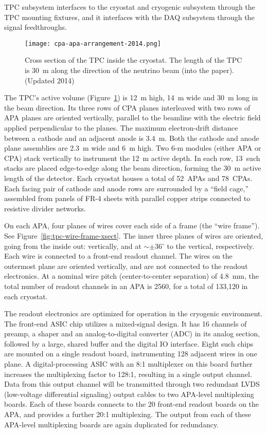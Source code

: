 TPC subsystem interfaces to the cryostat and cryogenic subsystem through the TPC mounting fixtures, 
and it interfaces with the DAQ subsystem through the signal feedthroughs.

\begin{figure}
\centering
\texttt{[image: cpa-apa-arrangement-2014.png]}%
\caption[Cross section of the TPC inside the cryostat]{Cross section of the TPC inside the cryostat.  The length of the TPC is  30~m along the direction of the neutrino beam (into the paper). (Updated 2014) }
\label{fig:tpc-xsect1}
\end{figure}

The TPC's active volume (Figure~\ref{fig:tpc-xsect1}) is 12~m high, 14~m wide and 30~m long in the beam direction. 
Its three rows of CPA planes interleaved with two rows of APA planes 
are oriented vertically, parallel to the beamline with the  
electric field applied perpendicular to the planes.
The maximum electron-drift distance between a cathode and an adjacent 
anode is 3.4~m. Both the cathode and anode plane assemblies are 
2.3~m wide and 6~m high. Two 6-m modules (either APA or CPA)  stack vertically to 
instrument the 12~m active depth. In each row, 13~such stacks are placed 
edge-to-edge 
along the beam direction, forming the 30~m active length of the detector.
Each cryostat houses a total of 52~APAs and 78~CPAs.
Each facing pair of cathode and anode rows are surrounded by a 
``field cage,'' assembled from panels of FR-4 sheets with parallel copper strips connected to resistive divider networks. 

On each APA, four planes of wires cover each side of a frame (the ``wire frame''). See Figure~\ref{fig:tpc-wire-frame-xsect}.
The inner three planes of wires are oriented, going from the inside out: vertically, and at $\sim\pm$36$^\circ$ 
to the vertical, respectively. Each wire is connected to a front-end readout channel.
The wires on the outermost plane are oriented vertically, and are not connected to the readout electronics.
At a nominal wire pitch (center-to-center separation) of 4.8~mm,
the total number of readout channels in an APA is 2560, for a total of 133,120 in each cryostat.
 
The readout electronics are optimized for operation in the cryogenic environment.  
The front-end ASIC chip utilizes a mixed-signal design.  
It has 16 channels of preamp, a shaper and an analog-to-digital converter (ADC) in its analog section,  
followed by a large, shared buffer and the digital IO interface. Eight such chips 
are mounted on a single readout board, instrumenting 128 adjacent wires in one plane. 
A digital-processing ASIC with an 8:1 multiplexer on this board further 
increases the multiplexing factor to 128:1, resulting in a single output channel. Data from this output channel will be transmitted 
through two redundant LVDS (low-voltage differential signaling) output cables to two APA-level multiplexing boards.  Each of these boards connects to the 20 front-end readout boards on the APA, and provides a further 20:1 multiplexing.  The output from each of these APA-level multiplexing boards are again duplicated for redundancy.


